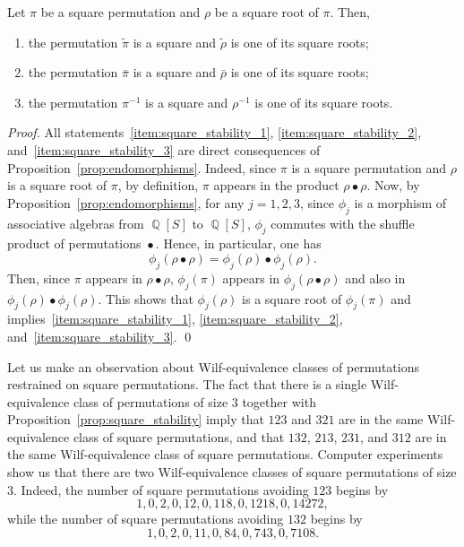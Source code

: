 \documentclass[a4paper,10pt]{llncs}
\DeclareMathOperator{\QQ}{\mathbb{Q}}
\DeclareMathOperator{\SHUFFLE}{\bullet}
\begin{document}
\begin{proposition} \label{prop:square_stability}
    Let $\pi$ be a square permutation and $\rho$ be a square root of
    $\pi$. Then,
    \begin{enumerate}[label={\it (\roman*)},fullwidth]
        \item \label{item:square_stability_1}
        the permutation $\widetilde{\pi}$ is a square and
        $\widetilde{\rho}$ is one of its square roots;
        \item \label{item:square_stability_2}
        the permutation $\bar \pi$ is a square and $\bar \rho$ is one of
        its square roots;
        \item \label{item:square_stability_3}
        the permutation $\pi^{-1}$ is a square and $\rho^{-1}$ is one of
        its square roots.
    \end{enumerate}
\end{proposition}
\begin{proof}
    All statements~\ref{item:square_stability_1},
    \ref{item:square_stability_2}, and~\ref{item:square_stability_3} are
    direct consequences of Proposition~\ref{prop:endomorphisms}. Indeed,
    since $\pi$ is a square permutation and $\rho$ is a square root of
    $\pi$, by definition, $\pi$ appears in the product
    $\rho \SHUFFLE \rho$. Now, by Proposition~\ref{prop:endomorphisms},
    for any $j = 1, 2, 3$, since $\phi_j$ is a morphism of associative
    algebras from $\QQ[S]$ to $\QQ[S]$, $\phi_j$ commutes with the
    shuffle product of permutations $\SHUFFLE$. Hence, in particular,
    one has
    \begin{equation}
        \phi_j(\rho \SHUFFLE \rho) =
        \phi_j(\rho) \SHUFFLE \phi_j(\rho).
    \end{equation}
    Then, since $\pi$ appears in $\rho \SHUFFLE \rho$, $\phi_j(\pi)$
    appears in $\phi_j(\rho \SHUFFLE \rho)$ and also in
    $\phi_j(\rho) \SHUFFLE \phi_j(\rho)$. This shows that
    $\phi_j(\rho)$ is a square root of $\phi_j(\pi)$ and
    implies~\ref{item:square_stability_1}, \ref{item:square_stability_2},
    and~\ref{item:square_stability_3}.
    \qed
\end{proof}
\medskip

Let us make an observation about Wilf-equivalence classes of
permutations restrained on square permutations. The fact that there is a
single Wilf-equivalence class of permutations of size $3$ together with
Proposition~\ref{prop:square_stability} imply that $123$ and $321$ are
in the same Wilf-equivalence class of square permutations, and that
$132$, $213$, $231$, and $312$ are in the same Wilf-equivalence class of
square permutations. Computer experiments show us that there are two
Wilf-equivalence classes of square permutations of size $3$. Indeed, the
number of square permutations avoiding $123$ begins by
\begin{equation}
    1, 0, 2, 0, 12, 0, 118, 0, 1218, 0, 14272,
\end{equation}
while the number of square permutations avoiding $132$ begins by
\begin{equation}
    1, 0, 2, 0, 11, 0, 84, 0, 743, 0, 7108.
\end{equation}
\medskip
\end{document}
